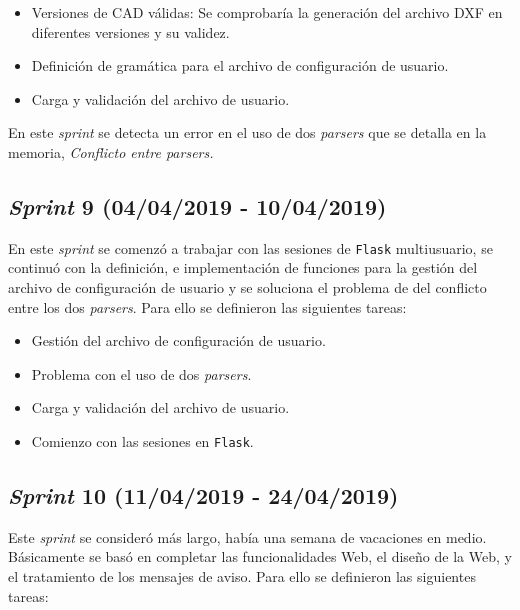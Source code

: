 \begin{itemize}
\item Versiones de CAD válidas: Se comprobaría la generación del archivo DXF en diferentes versiones y su validez. 

\item  Definición de gramática para el archivo de configuración de usuario.

\item Carga y validación del archivo de usuario.

\end{itemize}

En este \emph{sprint} se detecta un error en el uso de dos \emph{parsers} que se detalla en la memoria, \textit{Conflicto entre \emph{parsers}.}
 
\subsection{\emph{Sprint} 9 (04/04/2019 - 10/04/2019)}

En este \emph{sprint} se comenzó a trabajar con las sesiones de \texttt{Flask} multiusuario, se continuó con la definición, e implementación de funciones para la gestión del archivo de configuración de usuario y se soluciona el problema de del conflicto entre los dos \emph{parsers}. Para ello se definieron las siguientes tareas:

\begin{itemize}
\item Gestión del archivo de configuración de usuario. 

\item  Problema con el uso de dos \emph{parsers}.

\item Carga y validación del archivo de usuario.

\item Comienzo con las sesiones en \texttt{Flask}.
\end{itemize}

\subsection{\emph{Sprint} 10 (11/04/2019 - 24/04/2019)}

Este \emph{sprint} se consideró más largo, había una semana de vacaciones en medio. Básicamente se basó en completar las funcionalidades Web, el diseño de la Web, y el tratamiento de los mensajes de aviso. Para ello se definieron las siguientes tareas: 
 
